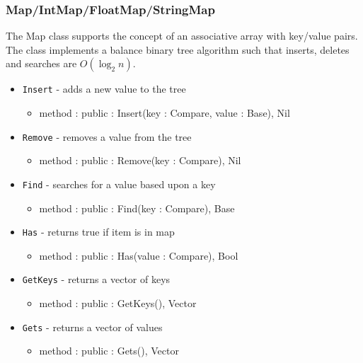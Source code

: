 \documentclass[12pt]{article}
\begin{document}
\subsubsection{Map/IntMap/FloatMap/StringMap}
The Map class supports the concept of an associative array with key/value pairs.  The class implements a balance binary tree algorithm such that inserts, deletes and searches are $O(\log_2 n)$.
\begin{itemize}
    \item \texttt{Insert} - adds a new value to the tree
    	\begin{itemize}
	\item method : public : Insert(key : Compare, value : Base), Nil
	\end{itemize}
    \item \texttt{Remove} - removes a value from the tree
    	\begin{itemize}
	\item method : public : Remove(key : Compare), Nil
	\end{itemize}
    \item \texttt{Find} - searches for a value based upon a key
    	\begin{itemize}
	\item method : public : Find(key : Compare), Base
	\end{itemize}
    \item \texttt{Has} - returns true if item is in map
    	\begin{itemize}
	\item method : public : Has(value : Compare), Bool
	\end{itemize}
    \item \texttt{GetKeys} - returns a vector of keys
    	\begin{itemize}
	\item method : public : GetKeys(), Vector
	\end{itemize}
    \item \texttt{Gets} - returns a vector of values
    	\begin{itemize}
	\item method : public : Gets(), Vector
	\end{itemize}
\end{itemize}
\end{document}
